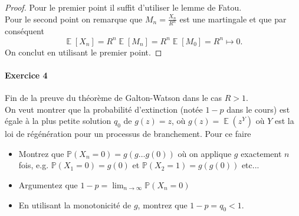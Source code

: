 \documentclass{article}
\theoremstyle{definition}
\numberwithin{equation}{section}
\DeclareMathOperator{\E}{\mathbb{E}}
\begin{document}
\begin{proof}
 Pour le premier point il suffit d'utiliser le lemme de Fatou.\\
 Pour le second point on remarque que $M_n=\frac{X_n}{R^n}$ est une martingale et que par conséquent 
 $$ \E[X_n] = R^n\E[M_n] = R^n \E[M_0] = R^n \mapsto 0. $$
 On conclut en utilisant le premier point.
\end{proof}


\paragraph{Exercice 4} Fin de la preuve du théorème de Galton-Watson dans le cas $R > 1$.\\
On veut montrer que la probabilité d'extinction (notée $1-p$ dans le cours) est égale à la plus petite solution $q_0$ de $g(z) = z$, où $g(z) = \E(z^Y)$ où $Y$ est la loi de régénération pour un processus de branchement. Pour ce faire
\begin{itemize}
    \item Montrez que $\mathbb{P}(X_n = 0) = g(g \dots g(0))$ où on applique $g$ exactement $n$ fois, e.g. $\mathbb{P}(X_1 = 0) = g(0)$ et $\mathbb{P}(X_2 = 1) = g(g(0))$ etc...
    \item Argumentez que $1-p = \lim_{n \to \infty} \mathbb{P}(X_n = 0)$
    \item En utilisant la monotonicité de $g$, montrez que $1-p = q_0 < 1$.
\end{itemize}
\end{document}
